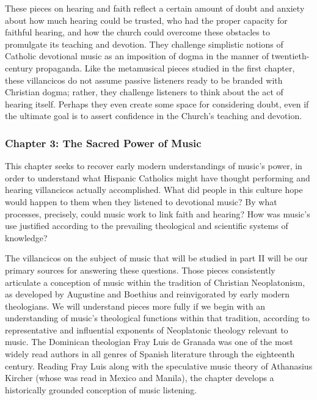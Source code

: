 \documentclass[tt]{vcbook-proposal}
\begin{document}
These pieces on hearing and faith reflect a certain amount of doubt and anxiety about how much hearing could be trusted, who had the proper capacity for faithful hearing, and how the church could overcome these obstacles to promulgate its teaching and devotion.
They challenge simplistic notions of Catholic devotional music as an imposition of dogma in the manner of twentieth-century propaganda. 
Like the metamusical pieces studied in the first chapter, these villancicos do not assume passive listeners ready to be branded with Christian dogma; rather, they challenge listeners to think about the act of hearing itself.
Perhaps they even create some space for considering doubt, even if the ultimate goal is to assert confidence in the Church's teaching and devotion.

\subsubsection{Chapter 3: The Sacred Power of Music}

This chapter seeks to recover early modern understandings of music's power, in order to understand what Hispanic Catholics might have thought performing and hearing villancicos actually accomplished.
What did people in this culture hope would happen to them when they listened to devotional music?
By what processes, precisely, could music work to link faith and hearing?
How was music's use justified according to the prevailing theological and scientific systems of knowledge?

The villancicos on the subject of music that will be studied in part II will be our primary sources for answering these questions.
Those pieces consistently articulate a conception of music within the tradition of Christian Neoplatonism, as developed by Augustine and Boethius and reinvigorated by early modern theologians.
We will understand pieces more fully if we begin with an understanding of music's theological functions within that tradition, according to representative and influential exponents of Neoplatonic theology relevant to music.
The Dominican theologian Fray Luis de Granada was one of the most widely read authors in all genres of Spanish literature through the eighteenth century.
Reading Fray Luis along with the speculative music theory of Athanasius Kircher (whose  was read in Mexico and Manila), the chapter develops a historically grounded conception of music listening.
\end{document}

